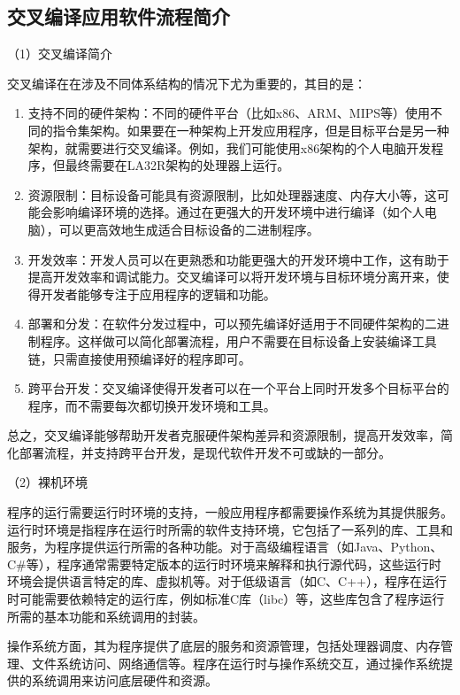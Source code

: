 \subsection{交叉编译应用软件流程简介}\label{sec:07-soc-and-system-009}

（1）交叉编译简介

交叉编译在在涉及不同体系结构的情况下尤为重要的，其目的是：

\begin{enumerate}
\def\labelenumi{\arabic{enumi}.}
\item
  支持不同的硬件架构：不同的硬件平台（比如x86、ARM、MIPS等）使用不同的指令集架构。如果要在一种架构上开发应用程序，但是目标平台是另一种架构，就需要进行交叉编译。例如，我们可能使用x86架构的个人电脑开发程序，但最终需要在LA32R架构的处理器上运行。
\item
  资源限制：目标设备可能具有资源限制，比如处理器速度、内存大小等，这可能会影响编译环境的选择。通过在更强大的开发环境中进行编译（如个人电脑），可以更高效地生成适合目标设备的二进制程序。
\item
  开发效率：开发人员可以在更熟悉和功能更强大的开发环境中工作，这有助于提高开发效率和调试能力。交叉编译可以将开发环境与目标环境分离开来，使得开发者能够专注于应用程序的逻辑和功能。
\item
  部署和分发：在软件分发过程中，可以预先编译好适用于不同硬件架构的二进制程序。这样做可以简化部署流程，用户不需要在目标设备上安装编译工具链，只需直接使用预编译好的程序即可。
\item
  跨平台开发：交叉编译使得开发者可以在一个平台上同时开发多个目标平台的程序，而不需要每次都切换开发环境和工具。
\end{enumerate}

总之，交叉编译能够帮助开发者克服硬件架构差异和资源限制，提高开发效率，简化部署流程，并支持跨平台开发，是现代软件开发不可或缺的一部分。

（2）裸机环境

程序的运行需要运行时环境的支持，一般应用程序都需要操作系统为其提供服务。运行时环境是指程序在运行时所需的软件支持环境，它包括了一系列的库、工具和服务，为程序提供运行所需的各种功能。对于高级编程语言（如Java、Python、C\#等），程序通常需要特定版本的运行时环境来解释和执行源代码，这些运行时环境会提供语言特定的库、虚拟机等。对于低级语言（如C、C++），程序在运行时可能需要依赖特定的运行库，例如标准C库（libc）等，这些库包含了程序运行所需的基本功能和系统调用的封装。

操作系统方面，其为程序提供了底层的服务和资源管理，包括处理器调度、内存管理、文件系统访问、网络通信等。程序在运行时与操作系统交互，通过操作系统提供的系统调用来访问底层硬件和资源。

